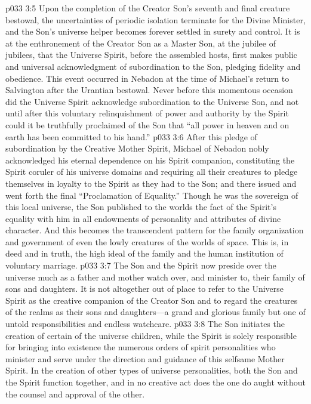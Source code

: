 \vs p033 3:5 Upon the completion of the Creator Son’s seventh and final creature bestowal, the uncertainties of periodic isolation terminate for the Divine Minister, and the Son’s universe helper becomes forever settled in surety and control. It is at the enthronement of the Creator Son as a Master Son, at the jubilee of jubilees, that the Universe Spirit, before the assembled hosts, first makes public and universal acknowledgment of subordination to the Son, pledging fidelity and obedience. This event occurred in Nebadon at the time of Michael’s return to Salvington after the Urantian bestowal. Never before this momentous occasion did the Universe Spirit acknowledge subordination to the Universe Son, and not until after this voluntary relinquishment of power and authority by the Spirit could it be truthfully proclaimed of the Son that “all power in heaven and on earth has been committed to his hand.”
\vs p033 3:6 After this pledge of subordination by the Creative Mother Spirit, Michael of Nebadon nobly acknowledged his eternal dependence on his Spirit companion, constituting the Spirit coruler of his universe domains and requiring all their creatures to pledge themselves in loyalty to the Spirit as they had to the Son; and there issued and went forth the final “Proclamation of Equality.” Though he was the sovereign of this local universe, the Son published to the worlds the fact of the Spirit’s equality with him in all endowments of personality and attributes of divine character. And this becomes the transcendent pattern for the family organization and government of even the lowly creatures of the worlds of space. This is, in deed and in truth, the high ideal of the family and the human institution of voluntary marriage.
\vs p033 3:7 The Son and the Spirit now preside over the universe much as a father and mother watch over, and minister to, their family of sons and daughters. It is not altogether out of place to refer to the Universe Spirit as the creative companion of the Creator Son and to regard the creatures of the realms as their sons and daughters---a grand and glorious family but one of untold responsibilities and endless watchcare.
\pc \vs p033 3:8 The Son initiates the creation of certain of the universe children, while the Spirit is solely responsible for bringing into existence the numerous orders of spirit personalities who minister and serve under the direction and guidance of this selfsame Mother Spirit. In the creation of other types of universe personalities, both the Son and the Spirit function together, and in no creative act does the one do aught without the counsel and approval of the other.
